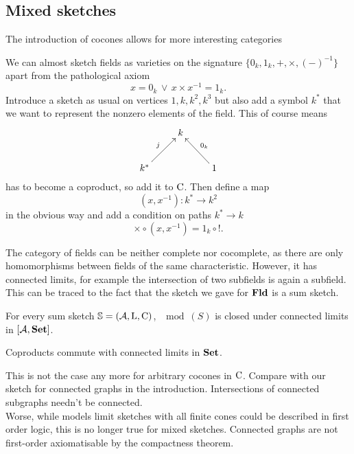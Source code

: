 \subsection{Mixed sketches}
The introduction of cocones allows for more interesting categories

\begin{Example}[Fields]
We can almost sketch fields as varieties on the signature $\{0_k,1_k,+,\times,(-)^{-1}\}$ apart from the pathological axiom
\[ x = 0_k \,\vee\,x \times x^{-1} = 1_k. \] 
Introduce a sketch as usual on vertices $1,k,k^2,k^3$ but also add a symbol $k^*$ that we want to represent the nonzero elements of the field. This of course means
\[
\xymatrix{
& k & \\
k^* \ar[ru]^{j} & & 1 \ar[lu]_{0_k}
}\]
has to become a coproduct, so add it to $\textrm{C}$. Then define a map 
\[ (x,x^{-1}) : k^* \to k^2 \]
in the obvious way and add a condition on paths $k^* \to k$
\[ \times \circ (x,x^{-1}) = 1_k \circ !. \]
\end{Example}

The category of fields can be neither complete nor cocomplete, as there are only homomorphisms between fields of the same characteristic. However, it has connected limits, for example the intersection of two subfields is again a subfield. This can be traced to the fact that the sketch we gave for $\mathbf{Fld}$ is a sum sketch. %

\begin{Proposition}
For every sum sketch $\mathbb S = (\mathcal{A}, \textrm{L}, \textrm{C})$, $\mod(S)$ is closed under connected limits in $[\mathcal{A},\mathbf{Set}]$.
\end{Proposition}
\begin{Proof}
Coproducts commute with connected limits in $\mathbf{Set}$.
\end{Proof}

This is not the case any more for arbitrary cocones in $\textrm{C}$. Compare with our sketch for connected graphs in the introduction. Intersections of connected subgraphs needn't be connected. \\

Worse, while models limit sketches with all finite cones could be described in first order logic, this is no longer true for mixed sketches. Connected graphs are not first-order axiomatisable by the compactness theorem. %

